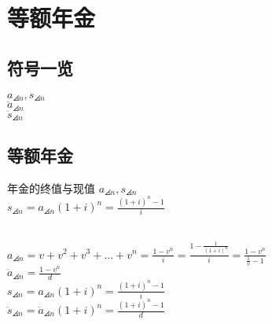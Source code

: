 \chapter{等额年金}
\section{符号一览}
\noindent$a_{\angles{n}},s_{\angles{n}}$\\	$\ddot{a}_{\angles{n}}$\\$\ddot{s}_{\angles{n}}$
\section{等额年金}
\begin{definition}{年金的终值与现值}
\noindent $a_{\angles{n}},s_{\angles{n}}$\\
$s_{\angles{n}}=a_{\angles{n}}(1+i)^{n}=\frac{(1+i)^{n}-1}{i}$
\end{definition}
 \\
\noindent $a_{\angles{n}}=v+v^2+v^3+\dots+v^n=\frac{1-v^n}{i}=\frac{1-\frac{1}{(1+i)^n}}{i}=\frac{1-v^n}{\frac{1}{v}-1}$\\
$\ddot{a}_{\angles{n}}=\frac{1-v^n}{d}$ \\
$s_{\angles{n}}=a_{\angles{n}}(1+i)^{n}=\frac{(1+i)^{n}-1}{i}$\\
$\ddot{s}_{\angles{n}}=\ddot{a}_{\angles{n}}(1+i)^{n}=\frac{(1+i)^{n}-1}{d}$
